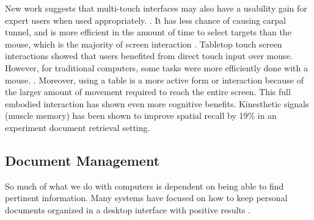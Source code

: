 \documentclass{article}
\begin{document}
	New work suggests that multi-touch interfaces may also have a usability gain for expert users when used appropriately. \cite{Forlines2007} \cite{Tan2002}\cite{North2009}.  It has less chance of causing carpal tunnel, and is more efficient in the amount of time to select targets than the mouse, which is the majority of screen interaction \cite{Forlines2007}.  Tabletop touch screen interactions showed that users benefited from direct touch input over mouse.  However, for traditional computers, some tasks were more efficiently done with a mouse. \cite{Kristensson2008}.  Moreover, using a table is a more active form or interaction because of the larger amount of movement required to reach the entire screen. This  full embodied interaction has shown  even more cognitive benefits. Kinesthetic signals (muscle memory) has been shown to improve spatial recall by 19\% in an experiment document retrieval setting.\cite{Tan2002} 


\subsection{Document Management}

So much of what we do with computers is dependent on being able to find pertinent information.  Many systems have focused on how to keep personal documents organized in a desktop interface with positive results \cite{Agarawala2006} \cite{Foo2007:ECDL} \cite{Foo2007:ICADL}. 





\end{document}
